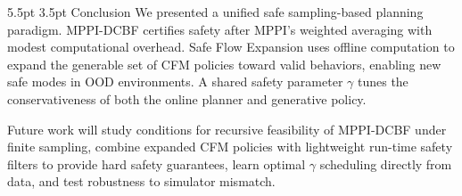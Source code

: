 \documentclass[letterpaper, 10 pt, conference]{ieeeconf}
\makeatletter
\renewcommand{\section}{%
  \@startsection{section}{1}{\z@}%
  {5.5pt}%
  {3.5pt}%
  {\normalfont\normalsize\centering\scshape}}
\makeatother
\begin{document}
\section{Conclusion}
We presented a unified safe sampling-based planning paradigm. MPPI-DCBF certifies safety after MPPI's weighted averaging with modest computational overhead. Safe Flow Expansion uses offline computation to expand the generable set of CFM policies toward valid behaviors, enabling new safe modes in OOD environments. A shared safety parameter $\gamma$ tunes the conservativeness of both the online planner and generative policy.

Future work will study conditions for recursive feasibility of MPPI-DCBF under finite sampling, combine expanded CFM policies with lightweight run-time safety filters to provide hard safety guarantees, learn optimal $\gamma$ scheduling directly from data, and test robustness to simulator mismatch. 


\end{document}
